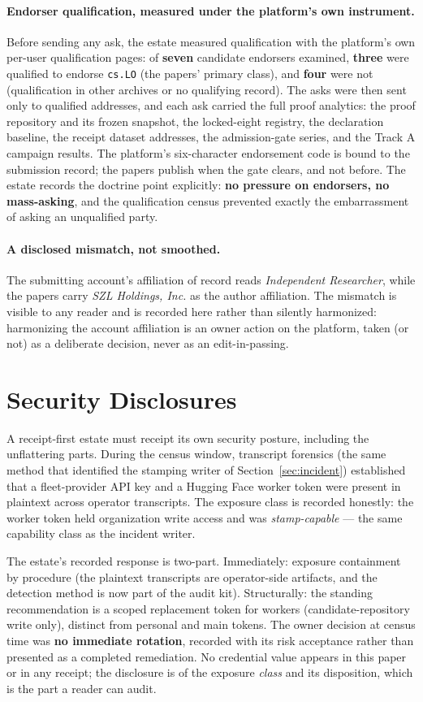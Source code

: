 \paragraph{Endorser qualification, measured under the platform's own instrument.} Before sending any ask, the estate measured qualification with the platform's own per-user qualification pages: of \textbf{seven} candidate endorsers examined, \textbf{three} were qualified to endorse \texttt{cs.LO} (the papers' primary class), and \textbf{four} were not (qualification in other archives or no qualifying record). The asks were then sent only to qualified addresses, and each ask carried the full proof analytics: the proof repository and its frozen snapshot, the locked-eight registry, the declaration baseline, the receipt dataset addresses, the admission-gate series, and the Track A campaign results. The platform's six-character endorsement code is bound to the submission record; the papers publish when the gate clears, and not before. The estate records the doctrine point explicitly: \textbf{no pressure on endorsers, no mass-asking}, and the qualification census prevented exactly the embarrassment of asking an unqualified party.

\paragraph{A disclosed mismatch, not smoothed.} The submitting account's affiliation of record reads \emph{Independent Researcher}, while the papers carry \emph{SZL Holdings, Inc.} as the author affiliation. The mismatch is visible to any reader and is recorded here rather than silently harmonized: harmonizing the account affiliation is an owner action on the platform, taken (or not) as a deliberate decision, never as an edit-in-passing.

\section{Security Disclosures}
\label{sec:security}

A receipt-first estate must receipt its own security posture, including the unflattering parts. During the census window, transcript forensics (the same method that identified the stamping writer of Section~\ref{sec:incident}) established that a fleet-provider API key and a Hugging Face worker token were present in plaintext across operator transcripts. The exposure class is recorded honestly: the worker token held organization write access and was \emph{stamp-capable} --- the same capability class as the incident writer.

The estate's recorded response is two-part. Immediately: exposure containment by procedure (the plaintext transcripts are operator-side artifacts, and the detection method is now part of the audit kit). Structurally: the standing recommendation is a scoped replacement token for workers (candidate-repository write only), distinct from personal and main tokens. The owner decision at census time was \textbf{no immediate rotation}, recorded with its risk acceptance rather than presented as a completed remediation. No credential value appears in this paper or in any receipt; the disclosure is of the exposure \emph{class} and its disposition, which is the part a reader can audit.
